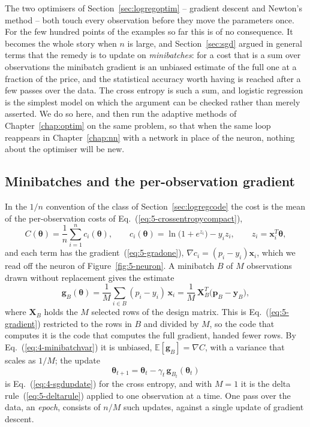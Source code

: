 The two optimisers of Section~\ref{sec:logregoptim} -- gradient descent and
Newton's method -- both touch every observation before they move the
parameters once.  For the few hundred points of the examples so far this is
of no consequence.  It becomes the whole story when $n$ is large, and
Section~\ref{sec:sgd} argued in general terms that the remedy is to update
on \emph{minibatches}: for a cost that is a sum over observations the
minibatch gradient is an unbiased estimate of the full one at a fraction of
the price, and the statistical accuracy worth having is reached after a few
passes over the data.  The cross entropy is such a sum, and logistic
regression is the simplest model on which the argument can be checked
rather than merely asserted.  We do so here, and then run the adaptive
methods of Chapter~\ref{chap:optim} on the same problem, so that when the
same loop reappears in Chapter~\ref{chap:nn} with a network in place of the
neuron, nothing about the optimiser will be new.

\subsection{Minibatches and the per-observation gradient}
\label{sec:logregminibatch}

In the $1/n$ convention of the class of Section~\ref{sec:logregcode} the
cost is the mean of the per-observation costs of
Eq.~(\ref{eq:5-crossentropycompact}),
\begin{equation}
  C(\bm{\theta}) = \frac1n\sum_{i=1}^{n}c_i(\bm{\theta}),
  \qquad
  c_i(\bm{\theta}) = \ln\bigl(1+e^{z_i}\bigr)-y_iz_i,
  \qquad z_i=\bm{x}_i^{T}\bm{\theta},
  \label{eq:5-costmean}
\end{equation}
and each term has the gradient~(\ref{eq:5-gradone}),
$\nabla c_i=(p_i-y_i)\bm{x}_i$, which we read off the neuron of
Figure~\ref{fig:5-neuron}.  A minibatch $B$ of $M$ observations drawn
without replacement gives the estimate
\begin{equation}
  \bm{g}_B(\bm{\theta})
   = \frac1M\sum_{i\in B}(p_i-y_i)\,\bm{x}_i
   = \frac1M\,\bm{X}_B^{T}\bigl(\bm{p}_B-\bm{y}_B\bigr),
  \label{eq:5-minibatchgrad}
\end{equation}
where $\bm{X}_B$ holds the $M$ selected rows of the design matrix.  This is
Eq.~(\ref{eq:5-gradient}) restricted to the rows in $B$ and divided by $M$,
so the code that computes it is the code that computes the full gradient,
handed fewer rows.  By Eq.~(\ref{eq:4-minibatchvar}) it is unbiased,
$\mathbb{E}[\bm{g}_B]=\nabla C$, with a variance that scales as $1/M$; the
update
\begin{equation}
  \bm{\theta}_{t+1} = \bm{\theta}_t - \gamma_t\,\bm{g}_{B_t}(\bm{\theta}_t)
  \label{eq:5-sgdupdate}
\end{equation}
is Eq.~(\ref{eq:4-sgdupdate}) for the cross entropy, and with $M=1$ it is
the delta rule~(\ref{eq:5-deltarule}) applied to one observation at a
time.  One pass over the data, an \emph{epoch}, consists of $n/M$ such
updates, against a single update of gradient descent.

